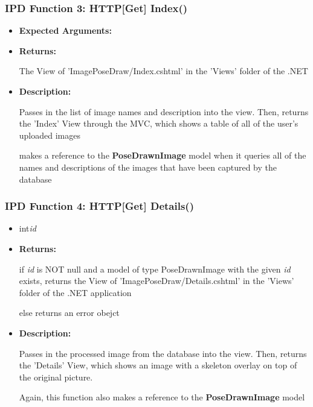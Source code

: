 \documentclass{scrreprt}
\begin{document}
\subsubsection{IPD Function 3: HTTP[Get] Index()}

\begin{itemize}
        \item \textbf{Expected Arguments:}

        \item \textbf{Returns:}

                The View of 'ImagePoseDraw/Index.cshtml' in the 'Views' folder
                of the .NET

        \item \textbf{Description:}

                Passes in the list of image names and description into the
                view. Then, returns the 'Index' View through the MVC, which
                shows a table of all of the user's uploaded images

                makes a reference to the \textbf{PoseDrawnImage} model when it
                queries all of the names and descriptions of the images that
                have been captured by the database
\end{itemize}

\subsubsection{IPD Function 4: HTTP[Get] Details()}

\begin{itemize}
        \item int\quad\textit{id}

        \item \textbf{Returns:}

                if \textit{id} is NOT null and a model of type PoseDrawnImage
                with the given \textit{id} exists, returns the View of
                'ImagePoseDraw/Details.cshtml' in the 'Views' folder of the
                .NET application

                else returns an error obejct

        \item \textbf{Description:}

                Passes in the processed image from the database into the view.
                Then, returns the 'Details' View, which shows an image with a
                skeleton overlay on top of the original picture.

                Again, this function also makes a reference to the
                \textbf{PoseDrawnImage} model
\end{itemize}
\end{document}
